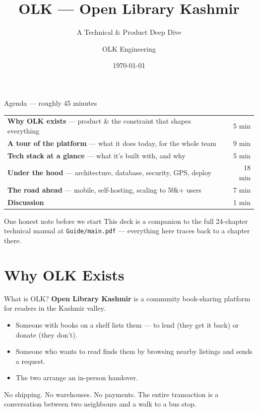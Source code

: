 \documentclass[aspectratio=169,11pt]{beamer}
\title{OLK --- Open Library Kashmir}
\subtitle{A Technical \& Product Deep Dive}
\author{OLK Engineering}
\date{\today}
\newcommand{\code}[1]{\textcolor{olkTealDark}{\texttt{#1}}}
\begin{document}
\begin{frame}
  \titlepage
\end{frame}

\begin{frame}{Agenda --- roughly 45 minutes}
  \small
  \begin{tabular}{@{}p{8cm}r@{}}
    \textbf{Why OLK exists} --- product \& the constraint that shapes everything & 5 min \\[2pt]
    \textbf{A tour of the platform} --- what it does today, for the whole team & 9 min \\[2pt]
    \textbf{Tech stack at a glance} --- what it's built with, and why & 5 min \\[2pt]
    \textbf{Under the hood} --- architecture, database, security, GPS, deploy & 18 min \\[2pt]
    \textbf{The road ahead} --- mobile, self-hosting, scaling to 50k+ users & 7 min \\[2pt]
    \textbf{Discussion} & 1 min \\
  \end{tabular}
  \vspace{8pt}
  \begin{alertblock}{One honest note before we start}
    \small This deck is a companion to the full 24-chapter technical manual at \code{Guide/main.pdf} --- everything here traces back to a chapter there.
  \end{alertblock}
\end{frame}

\section{Why OLK Exists}

\begin{frame}{What is OLK?}
  \textbf{Open Library Kashmir} is a community book-sharing platform for readers in the Kashmir valley.
  \begin{itemize}
    \item Someone with books on a shelf lists them --- to \alert{lend} (they get it back) or \alert{donate} (they don't).
    \item Someone who wants to read finds them by browsing \alert{nearby} listings and sends a request.
    \item The two arrange an in-person handover.
  \end{itemize}
  \vfill
  \begin{block}{No shipping. No warehouses. No payments.}
    The entire transaction is a conversation between two neighbours and a walk to a bus stop.
  \end{block}
\end{frame}
\end{document}
